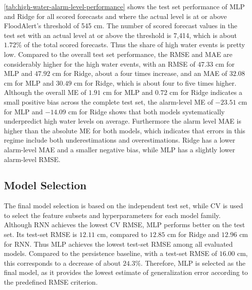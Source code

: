 \autoref{tab:high-water-alarm-level-performance} shows the test set performance of \ac{MLP} and Ridge for all scored forecasts and where the actual level is at or above FloodAlert's threshold of 545 cm. The number of scored forecast values in the test set with an actual level at or above the threshold is 7,414, which is about $1.72\%$ of the total scored forecasts. Thus the share of high water events is pretty low. Compared to the overall test set performance, the \ac{RMSE} and \ac{MAE} are considerably higher for the high water events, with an \ac{RMSE} of $47.33$ cm for \ac{MLP} and $47.92$ cm for Ridge, about a four times increase, and an \ac{MAE} of $32.08$ cm for \ac{MLP} and $30.49$ cm for Ridge, which is about four to five times higher. Although the overall \ac{ME} of $1.91$ cm for \ac{MLP} and $0.72$ cm for Ridge indicates a small positive bias across the complete test set, the alarm-level \ac{ME} of $-23.51$ cm for \ac{MLP} and $-14.09$ cm for Ridge shows that both models systematically underpredict high water levels on average. Furthermore the alarm level \ac{MAE} is higher than the absolute \ac{ME} for both models, which indicates that errors in this regime include both underestimations and overestimations. Ridge has a lower alarm-level \ac{MAE} and a smaller negative bias, while \ac{MLP} has a slightly lower alarm-level \ac{RMSE}.
\begin{table}[htbp]
  \centering
  
  \caption{Test set performance of \ac{MLP} and Ridge for all scored forecasts and where the actual level is at or above FloodAlert's threshold (545 cm). N denotes scored forecasts.}\label{tab:high-water-alarm-level-performance}
\end{table}

\subsection{Model Selection}
The final model selection is based on the independent test set, while \ac{CV} is used to select the feature subsets and hyperparameters for each model family. Although \ac{RNN} achieves the lowest \ac{CV} \ac{RMSE}, \ac{MLP} performs better on the test set. Its test-set \ac{RMSE} is $12.11$ cm, compared to $12.85$ cm for Ridge and $12.96$ cm for \ac{RNN}. Thus \ac{MLP} achieves the lowest test-set \ac{RMSE} among all evaluated models. Compared to the persistence baseline, with a test-set \ac{RMSE} of $16.00$ cm, this corresponds to a decrease of about $24.3\%$. Therefore, \ac{MLP} is selected as the final model, as it provides the lowest estimate of generalization error according to the predefined \ac{RMSE} criterion.


